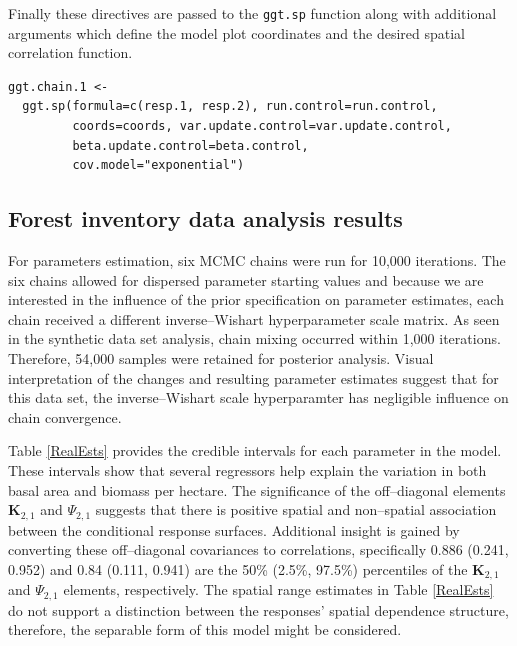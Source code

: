 \documentclass[a4paper]{article}
\newcommand{\bK}{\textbf{K}}
\let\code=\texttt
\begin{document}
Finally these directives are passed to the \code{ggt.sp} function along with additional arguments which define the model plot coordinates and the desired spatial correlation function.
\begin{verbatim}
ggt.chain.1 <-
  ggt.sp(formula=c(resp.1, resp.2), run.control=run.control,
         coords=coords, var.update.control=var.update.control,
         beta.update.control=beta.control,
         cov.model="exponential")
\end{verbatim}

\subsection{Forest inventory data analysis results}
For parameters estimation, six MCMC chains were run for 10,000 iterations.  The six chains allowed for dispersed parameter starting values and because we are interested in the influence of the prior specification on parameter estimates, each chain received a different inverse--Wishart hyperparameter scale matrix.  As seen in the synthetic data set analysis, chain mixing occurred within 1,000 iterations.  Therefore, 54,000 samples were retained for posterior analysis.  Visual interpretation of the changes and resulting parameter estimates suggest that for this data set, the inverse--Wishart scale hyperparamter has negligible influence on chain convergence.

Table \ref{RealEsts} provides the credible intervals for each parameter in the model.  These intervals show that several regressors help explain the variation in both basal area and biomass per hectare.  The significance of the off--diagonal elements $\bK_{2,1}$ and $\Psi_{2,1}$ suggests that there is positive spatial and non--spatial association between the conditional response surfaces.  Additional insight is gained by converting these off--diagonal covariances to correlations, specifically 0.886 (0.241, 0.952) and 0.84 (0.111, 0.941) are the 50\% (2.5\%, 97.5\%) percentiles of the $\bK_{2,1}$ and $\Psi_{2,1}$ elements, respectively.  The spatial range estimates in Table \ref{RealEsts} do not support a distinction between the responses' spatial dependence structure, therefore, the separable form of this model might be considered.
\end{document}
